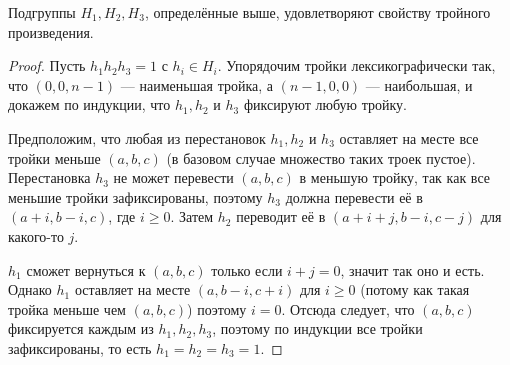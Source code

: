 \begin{theorem}\label{th:05:1.7}
  Подгруппы $H_1, H_2, H_3$, определённые выше, удовлетворяют свойству тройного произведения.
\end{theorem}
\begin{proof}
	Пусть $h_1h_2h_3=1$ с $h_i \in H_i$. Упорядочим тройки лексикографически так, что $(0,0,n-1)$ --- наименьшая тройка, а $(n-1,0,0)$ --- наибольшая, и докажем по индукции, что $h_1, h_2$ и $h_3$ фиксируют любую тройку.

	Предположим, что любая из перестановок $h_1, h_2$ и $h_3$ оставляет на месте все тройки меньше $(a,b,c)$ (в базовом случае множество таких троек пустое). Перестановка $h_3$ не может перевести  $(a,b,c)$  в меньшую тройку, так как все меньшие тройки зафиксированы, поэтому $h_3$ должна перевести её в $(a+i, b-i, c)$, где $i \geq 0$. Затем $h_2$ переводит её в $(a+i+j, b-i, c-j)$ для какого-то $j$.

	$h_1$ сможет вернуться к $(a,b,c)$ только если $i+j=0$, значит так оно и есть. Однако $h_1$ оставляет на месте $(a,b-i,c+i)$ для $i \geq 0$ (потому как такая тройка меньше чем $(a,b,c)$) поэтому $i=0$. Отсюда следует, что $(a,b,c)$ фиксируется каждым из $h_1, h_2, h_3$, поэтому по индукции все тройки зафиксированы, то есть $h_1=h_2=h_3=1$. 
\end{proof}
